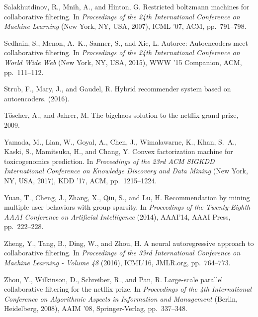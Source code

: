 \documentclass{article}
\begin{document}
\begin{thebibliography}{10}
{\sc Salakhutdinov, R., Mnih, A., and Hinton, G.}
\newblock Restricted boltzmann machines for collaborative filtering.
\newblock In {\em Proceedings of the 24th International Conference on Machine
  Learning\/} (New York, NY, USA, 2007), ICML '07, ACM, pp.~791--798.

{\sc Sedhain, S., Menon, A.~K., Sanner, S., and Xie, L.}
\newblock Autorec: Autoencoders meet collaborative filtering.
\newblock In {\em Proceedings of the 24th International Conference on World
  Wide Web\/} (New York, NY, USA, 2015), WWW '15 Companion, ACM, pp.~111--112.

{\sc Strub, F., Mary, J., and Gaudel, R.}
\newblock Hybrid recommender system based on autoencoders.
 (2016).

{\sc T{\"o}scher, A., and Jahrer, M.}
\newblock The bigchaos solution to the netflix grand prize, 2009.

{\sc Yamada, M., Lian, W., Goyal, A., Chen, J., Wimalawarne, K., Khan, S.~A.,
  Kaski, S., Mamitsuka, H., and Chang, Y.}
\newblock Convex factorization machine for toxicogenomics prediction.
\newblock In {\em Proceedings of the 23rd ACM SIGKDD International Conference
  on Knowledge Discovery and Data Mining\/} (New York, NY, USA, 2017), KDD '17,
  ACM, pp.~1215--1224.

{\sc Yuan, T., Cheng, J., Zhang, X., Qiu, S., and Lu, H.}
\newblock Recommendation by mining multiple user behaviors with group sparsity.
\newblock In {\em Proceedings of the Twenty-Eighth AAAI Conference on
  Artificial Intelligence\/} (2014), AAAI'14, AAAI Press, pp.~222--228.

{\sc Zheng, Y., Tang, B., Ding, W., and Zhou, H.}
\newblock A neural autoregressive approach to collaborative filtering.
\newblock In {\em Proceedings of the 33rd International Conference on Machine
  Learning - Volume 48\/} (2016), ICML'16, JMLR.org, pp.~764--773.

{\sc Zhou, Y., Wilkinson, D., Schreiber, R., and Pan, R.}
\newblock Large-scale parallel collaborative filtering for the netflix prize.
\newblock In {\em Proceedings of the 4th International Conference on
  Algorithmic Aspects in Information and Management\/} (Berlin, Heidelberg,
  2008), AAIM '08, Springer-Verlag, pp.~337--348.

\end{thebibliography} 
\end{document}
